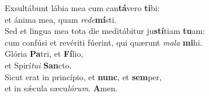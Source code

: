 \evenverse Exsultábunt lábia mea cum can\textbf{tá}vero \textbf{ti}bi:~\*\\
\evenverse et ánima mea, quam \textit{re}\textit{de}\textbf{mí}sti.\\
\oddverse Sed et lingua mea tota die meditábitur ju\textbf{stí}tiam \textbf{tu}am:~\*\\
\oddverse cum confúsi et revériti fúerint, qui quærunt \textit{ma}\textit{la} \textbf{mi}hi.\\
\evenverse Glória \textbf{Pa}tri, et \textbf{Fí}lio,~\*\\
\evenverse et Spirí\textit{tu}\textit{i} \textbf{San}cto.\\
\oddverse Sicut erat in princípio, et \textbf{nunc}, et \textbf{sem}per,~\*\\
\oddverse et in sǽcula sæcu\textit{ló}\textit{rum}. \textbf{A}men.\\
